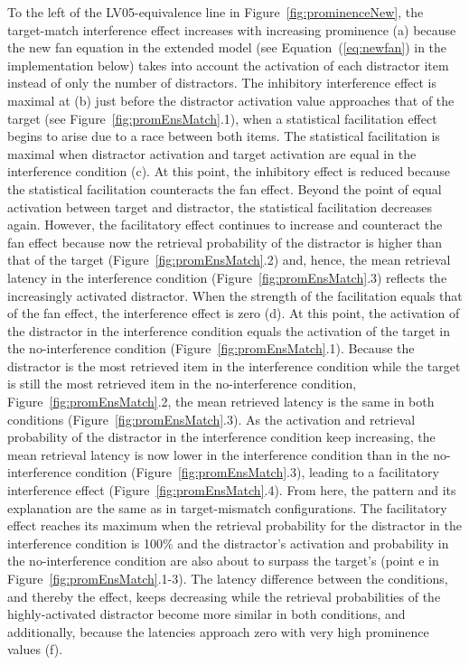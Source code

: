 \documentclass{cambridge7A}\usepackage[]{graphicx}\usepackage[]{color}
\begin{document}
To the left of the LV05-equivalence line in Figure~\ref{fig:prominenceNew}, the target-match interference effect increases with increasing prominence (a) because the new fan equation in the extended model (see Equation~(\ref{eq:newfan}) in the implementation below) takes into account the activation of each distractor item instead of only the number of distractors.
The inhibitory interference effect is maximal at (b) just before the distractor activation value approaches that of the target (see Figure~\ref{fig:promEnsMatch}.1), when a statistical facilitation effect begins to arise due to a race between both items. The statistical facilitation is maximal when distractor activation and target activation are equal in the interference condition (c). At this point, the inhibitory effect is reduced because the statistical facilitation counteracts the fan effect. 
Beyond the point of equal activation between target and distractor, the statistical facilitation decreases again. However, the facilitatory effect continues to increase and counteract the  fan effect because now the retrieval probability of the distractor is higher than that of the target (Figure~\ref{fig:promEnsMatch}.2) and, hence, the mean retrieval latency in the interference condition (Figure~\ref{fig:promEnsMatch}.3) reflects the increasingly activated distractor. 
When the strength of the facilitation equals that of the fan effect, the interference effect is zero (d). At this point, the activation of the distractor in the interference condition equals the activation of the target in the no-interference condition (Figure~\ref{fig:promEnsMatch}.1). Because the distractor is the most retrieved item in the interference condition while the target is still the most retrieved item in the no-interference condition, Figure~\ref{fig:promEnsMatch}.2, the mean retrieved latency is the same in both conditions (Figure~\ref{fig:promEnsMatch}.3).
As the activation and retrieval probability of the distractor in the interference condition keep increasing, the mean retrieval latency is now lower in the interference condition than in the no-interference condition (Figure~\ref{fig:promEnsMatch}.3), leading to a facilitatory interference effect (Figure~\ref{fig:promEnsMatch}.4). 
From here, the pattern and its explanation are the same as in target-mismatch configurations. The facilitatory effect reaches its maximum when the retrieval probability for the distractor in the interference condition is 100\% and the distractor's activation and probability in the no-interference condition are also about to surpass the target's (point e in Figure~\ref{fig:promEnsMatch}.1-3). The latency difference between the conditions, and thereby the effect, keeps decreasing while the retrieval probabilities of the highly-activated distractor become more similar in both conditions, and additionally, because the latencies approach zero with very high prominence values (f).
\end{document}
